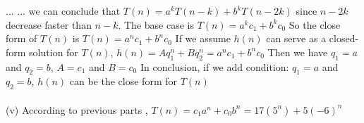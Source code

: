 \documentclass[12pt]{article}
\begin{document}
\qquad \qquad \qquad \qquad ...\vskip5pt
\qquad \qquad \qquad \qquad ...\vskip5pt
we can conclude that $T(n) = a^kT(n-k) + b^kT(n-2k)$\vskip5pt
since $n-2k$ decrease faster than $n-k$. 
The base case is $T(n) = a^kc_1 + b^kc_0$ \vskip5pt
So the close form of $T(n)$ is $T(n) = a^nc_1 + b^nc_0$ \vskip5pt
If we assume $h(n)$ can serve as a closed-form solution for $T(n)$,\vskip5pt
$h(n) = Aq_1^n+Bq_2^n = a^nc_1 + b^nc_0$\vskip5pt
Then we have $q_1 = a$ and $q_2 = b$, $A = c_1$ and $B=c_0$\vskip5pt
In conclusion, if we add condition: $q_1 = a$ and $q_2 = b$, $h(n)$ can be the close form for $T(n)$
\\[2ex]
\\[2ex]
(v)  According to previous parts , $T(n) = c_1a^n + c_0b^n = 17(5^n) + 5(-6)^n$
\end{document}

